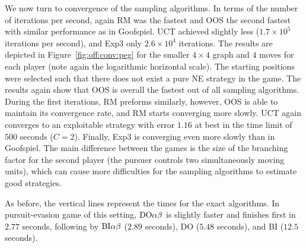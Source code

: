 We now turn to convergence of the sampling algorithms.
In terms of the number of iterations per second, again RM was the fastest and OOS the second fastest with similar performance as in Goofspiel.
UCT achieved slightly less ($1.7\times10^5$ iterations per second), and Exp3 only $2.6\times10^4$ iterations.
The results are depicted in Figure~\ref{fig:off:conv:peg} for the smaller $4\times4$ graph and $4$ moves for each player (note again the logarithmic horizontal scale).
The starting positions were selected such that there does not exist a pure NE strategy in the game.
The results again show that OOS is overall the fastest out of all sampling algorithms.
During the first iterations, RM preforms similarly, however, OOS is able to maintain its convergence rate, and  RM starts converging more slowly.
UCT again converges to an exploitable strategy with error $1.16$ at best in the time limit of $500$ seconds ($C=2$).
Finally, Exp3 is converging even more slowly than in Goofspiel.
The main difference between the games is the size of the branching factor for the second player (the pursuer controls two simultaneously moving units), which can cause more difficulties for the sampling algorithms to estimate good strategies.

As before, the vertical lines represent the times for the exact algorithms.
In pursuit-evasion game of this setting, $\textrm{DO}\alpha\beta$ is slightly faster and finishes first in $2.77$ seconds, following by $\textrm{BI}\alpha\beta$ ($2.89$ seconds), \textsc{DO} ($5.48$ seconds), and \textsc{BI} ($12.5$ seconds).

